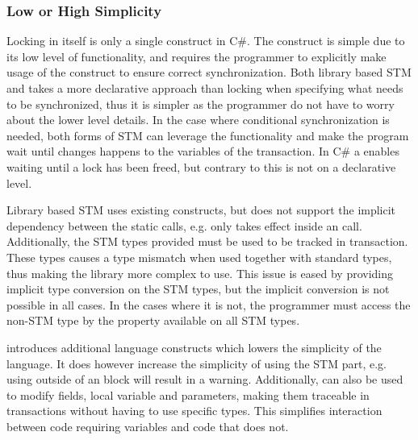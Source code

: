 \subsubsection{Low or High Simplicity}\label{subsec:simplicity}
Locking in itself is only a single construct in C\#. The construct is simple due to its low level of functionality, and requires the programmer to explicitly make usage of the construct to ensure correct synchronization. Both library based \ac{STM} and \stmname takes a more declarative approach than locking when specifying what needs to be synchronized, thus it is simpler as the programmer do not have to worry about the lower level details. In the case where conditional synchronization is needed, both forms of \ac{STM} can leverage the  functionality and make the program wait until changes happens to the variables of the transaction. In C\# a  enables waiting until a lock has been freed, but contrary to  this is not on a declarative level.

Library based \ac{STM} uses existing constructs, but does not support the implicit dependency between the static calls, e.g.  only takes effect inside an  call. Additionally, the \ac{STM} types provided must be used to be tracked in transaction. These types causes a type mismatch when used together with standard types, thus making the library more complex to use. This issue is eased by providing implicit type conversion on the \ac{STM} types, but the implicit conversion is not possible in all cases. In the cases where it is not, the programmer must access the non-\ac{STM} type by the  property available on all \ac{STM} types. 

\stmnamesp introduces additional language constructs which lowers the simplicity of the language. It does however increase the simplicity of using the \ac{STM} part, e.g. using  outside of an  block will result in a warning. Additionally,  can also be used to modify fields, local variable and parameters, making them traceable in transactions without having to use specific types. This simplifies interaction between code requiring  variables and code that does not. 




